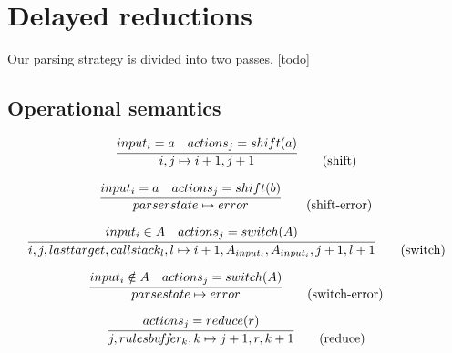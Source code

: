 \documentclass[envcountsame,runningheads]{llncs}
\begin{document}



\section{Delayed reductions}

Our parsing strategy is divided into two passes.
[todo]

\subsection{Operational semantics}

\begin{equation}
\infer{i, j \mapsto i+1, j+1}{input_i = a & actions_j = shift(a)} \tag{shift}
\end{equation}

\begin{equation}
\infer{parserstate \mapsto error}{input_i = a & actions_j = shift(b)} \tag{shift-error}
\end{equation}

\begin{equation}
\infer{i, j, lasttarget, callstack_l, l \mapsto i+1, A_{input_i}, A_{input_i}, j+1, l+1}{input_i \in A & actions_j = switch(A)} \tag{switch}
\end{equation}

\begin{equation}
\infer{parsestate \mapsto error}{input_i \notin A & actions_j = switch(A)} \tag{switch-error}
\end{equation}

\begin{equation}
\infer{j, rulesbu\!f\!f\!er_k, k \mapsto j+1, r, k+1}{actions_j = reduce(r)} \tag{reduce}
\end{equation}
\end{document}
